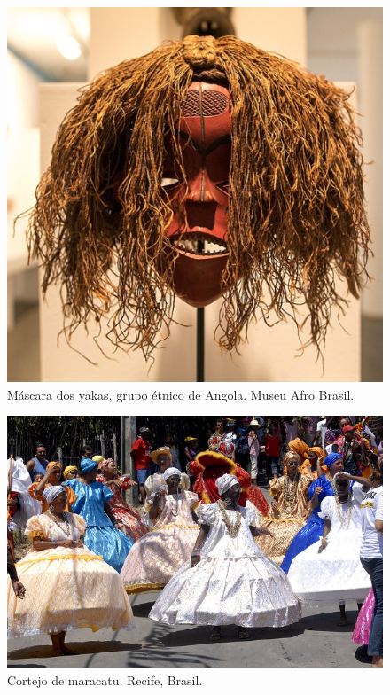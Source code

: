 \begin{figure}[htpb!]
\includegraphics[width=.5\textwidth]{./imgs/art34a.png}
\caption{Máscara dos yakas, grupo étnico de Angola. Museu Afro Brasil.}
\end{figure}
\begin{figure}[htpb!]
\includegraphics[width=.5\textwidth]{./imgs/art34b.png}
\caption{Cortejo de maracatu. Recife, Brasil.}
\end{figure}


